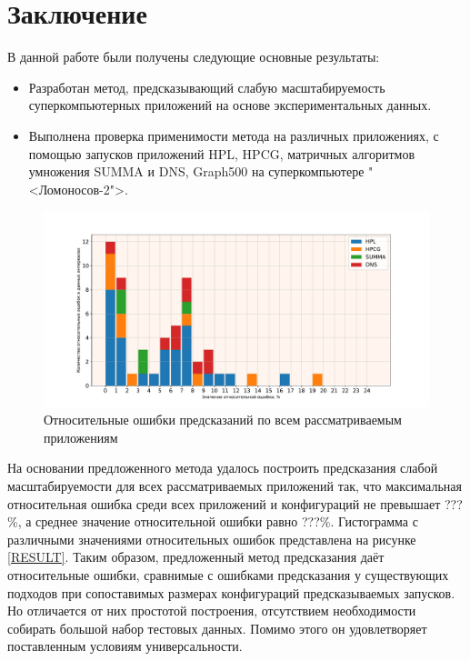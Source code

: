 \section{Заключение}
	В данной работе были получены следующие основные результаты:
	\begin{itemize}
		\item Разработан метод, предсказывающий слабую масштабируемость суперкомпьютерных приложений на основе экспериментальных данных.
		\item Выполнена проверка применимости метода на различных приложениях, с помощью запусков приложений HPL, HPCG, матричных алгоритмов умножения SUMMA и DNS, Graph500 на суперкомпьютере "<Ломоносов-2">.
	\end{itemize}

	\begin{figure}
		\centering
		\includegraphics[width=\textwidth]{./images/conclusion_graph}
		\caption{Относительные ошибки предсказаний по всем рассматриваемым приложениям}
		\label{RESULT}
	\end{figure}

	На основании предложенного метода удалось построить предсказания слабой масштабируемости для всех рассматриваемых приложений так, что максимальная относительная ошибка среди всех приложений и конфигураций не превышает ???\%, а среднее значение относительной ошибки равно ???\%. Гистограмма с различными значениями относительных ошибок представлена на рисунке \eqref{RESULT}. Таким образом, предложенный метод предсказания даёт относительные ошибки, сравнимые с ошибками предсказания у существующих подходов при сопоставимых размерах конфигураций предсказываемых запусков. Но отличается от них простотой построения, отсутствием необходимости собирать большой набор тестовых данных. Помимо этого он удовлетворяет поставленным условиям универсальности.
\clearpage
